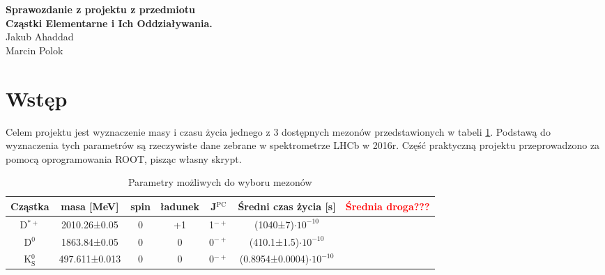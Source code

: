 {
	\centering
	{\large\bfseries Sprawozdanie z projektu z przedmiotu \\
	Cząstki Elementarne i Ich Oddziaływania.\\}
	\vspace{1em}
	{
	Jakub Ahaddad\\

	Marcin Polok\\
	}
	\vspace{3em}
}

\section{Wstęp}
Celem projektu jest wyznaczenie masy i czasu życia jednego z 3 dostępnych mezonów przedstawionych w tabeli \ref{tab_mesons}. Podstawą do wyznaczenia tych parametrów
są rzeczywiste dane zebrane w spektrometrze LHCb w 2016r. Część praktyczną projektu przeprowadzono za pomocą
oprogramowania ROOT, pisząc własny skrypt.

\begin{table}[H]
\centering
\caption{Parametry możliwych do wyboru mezonów\cite{database:K}\cite{database:D0}\cite{database:D*}}
\label{tab_mesons}
\begin{tabular}{ccccccc}

Cząstka		&masa [MeV]	&spin	&ładunek&J$^\text{PC}$	&Średni czas życia [s]		&\textcolor{red}{Średnia droga???} 	\\ \hline

D$^{*+}$	&2010.26±0.05	&0	&+1	&1$^{-+}$	&(1040±7)$\cdot10^{-10}$	&		\\
D$^0$		&1863.84±0.05	&0	&0	&0$^{-+}$	&(410.1±1.5)$\cdot10^{-10}$	&		\\
K$^0_\text{S}$	&497.611±0.013	&0	&0	&0$^{-+}$	&(0.8954±0.0004)$\cdot10^{-10}$	&		\\

\end{tabular}
\end{table}
